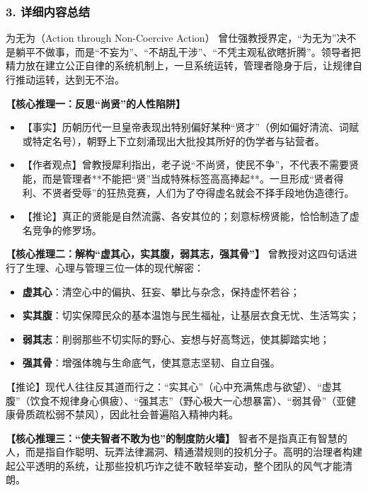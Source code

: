 \subsubsection{3. 详细内容总结}

\begin{ConceptBox}{为无为（Action through Non-Coercive Action）}
曾仕强教授界定，“为无为”决不是躺平不做事，而是“不妄为”、“不胡乱干涉”、“不凭主观私欲瞎折腾”。领导者把精力放在建立公正自律的系统机制上，一旦系统运转，管理者隐身于后，让规律自行推动运转，达到无不治。
\end{ConceptBox}

\noindent\textbf{【核心推理一：反思“尚贤”的人性陷阱】}
\begin{itemize}
    \item 【事实】历朝历代一旦皇帝表现出特别偏好某种“贤才”（例如偏好清流、词赋或特定名号），朝野上下立刻涌现出大批投其所好的伪学者与钻营者。
    \item 【作者观点】曾教授犀利指出，老子说“不尚贤，使民不争”，不代表不需要贤能，而是管理者**不能把“贤”当成特殊标签高高捧起**。一旦形成“贤者得利、不贤者受辱”的狂热竞赛，人们为了夺得虚名就会不择手段地伪造德行。
    \item 【推论】真正的贤能是自然流露、各安其位的；刻意标榜贤能，恰恰制造了虚名竞争的修罗场。
\end{itemize}

\noindent\textbf{【核心推理二：解构“虚其心，实其腹，弱其志，强其骨”】}
曾教授对这四句话进行了生理、心理与管理三位一体的现代解密：
\begin{itemize}
    \item \textbf{虚其心}：清空心中的偏执、狂妄、攀比与杂念，保持虚怀若谷；
    \item \textbf{实其腹}：切实保障民众的基本温饱与民生福祉，让基层衣食无忧、生活笃实；
    \item \textbf{弱其志}：削弱那些不切实际的野心、妄想与好高骛远，使其脚踏实地；
    \item \textbf{强其骨}：增强体魄与生命底气，使其意志坚韧、自立自强。
\end{itemize}
【推论】现代人往往反其道而行之：“实其心”（心中充满焦虑与欲望）、“虚其腹”（饮食不规律身心俱疲）、“强其志”（野心极大一心想暴富）、“弱其骨”（亚健康骨质疏松弱不禁风），因此社会普遍陷入精神内耗。

\noindent\textbf{【核心推理三：“使夫智者不敢为也”的制度防火墙】}
智者不是指真正有智慧的人，而是指自作聪明、玩弄法律漏洞、精通潜规则的投机分子。高明的治理者构建起公平透明的系统，让那些投机巧诈之徒不敢轻举妄动，整个团队的风气才能清朗。

